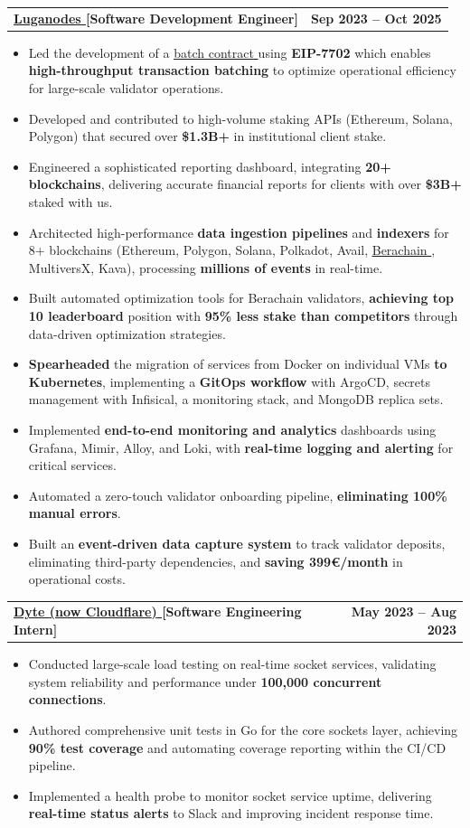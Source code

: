 \documentclass[a4paper,11pt]{article}
\makeatletter
\newcommand{\resumeItem}[1]{
  \item\small{
    {#1 \vspace{-2pt}}
  }
}
\newcommand{\resumeSubheadingg}[2]{
  \vspace{-2pt}\item
    \begin{tabular*}{1.0\textwidth}[t]{l@{\extracolsep{\fill}}r}
      \textbf{#1} & \textbf{\small #2} \\
    \end{tabular*}\vspace{-7pt}
}
\newcommand{\resumeItemListStart}{\begin{itemize}}
\newcommand{\resumeItemListEnd}{\end{itemize}\vspace{-5pt}}
\makeatother
\begin{document}
  \resumeSubheadingg
      {\href{https://www.luganodes.com/}{Luganodes \scriptsize\faExternalLink*} \hspace{0.5mm} [Software Development Engineer]}{Sep 2023 -- Oct 2025}
      \resumeItemListStart
      \resumeItem{Led the development of a {\href{https://github.com/luganodes/Pectra-Batch-Contract}{\underline{batch contract} \scriptsize\faExternalLink*}} using \textbf{EIP-7702} which enables \textbf{high-throughput transaction batching} to optimize operational efficiency for large-scale validator operations.}
      \resumeItem{Developed and contributed to high-volume staking APIs (Ethereum, Solana, Polygon) that secured over \textbf{\$1.3B+} in institutional client stake.}
      \resumeItem{Engineered a sophisticated reporting dashboard, integrating \textbf{20+ blockchains}, delivering accurate financial reports for clients with over \textbf{\$3B+} staked with us.}
      \resumeItem{Architected high-performance \textbf{data ingestion pipelines} and \textbf{indexers} for 8+ blockchains (Ethereum, Polygon, Solana, Polkadot, Avail, \href{https://github.com/luganodes/berachain-indexer}{\underline{Berachain} \scriptsize\faExternalLink*}, MultiversX, Kava), processing \textbf{millions of events} in real-time.}
      \resumeItem{Built automated optimization tools for Berachain validators, \textbf{achieving top 10 leaderboard} position with \textbf{95\% less stake than competitors} through data-driven optimization strategies.}
      \resumeItem{\textbf{Spearheaded} the migration of services from Docker on individual VMs \textbf{to Kubernetes}, implementing a \textbf{GitOps workflow} with ArgoCD, secrets management with Infisical, a monitoring stack, and MongoDB replica sets.}
      \resumeItem{Implemented \textbf{end-to-end monitoring and analytics} dashboards using Grafana, Mimir, Alloy, and Loki, with \textbf{real-time logging and alerting} for critical services.}
      \resumeItem{Automated a zero-touch validator onboarding pipeline, \textbf{eliminating 100\% manual errors}.}
      \resumeItem{Built an \textbf{event-driven data capture system} to track validator deposits, eliminating third-party dependencies, and \textbf{saving 399€/month} in operational costs.}
    \resumeItemListEnd
    \vspace{6pt}

\resumeSubheadingg
      {\href{https://dyte.io/}{Dyte \textnormal{(now \textbf{Cloudflare})} \scriptsize\faExternalLink*} \hspace{0.5mm} [Software Engineering Intern]}{May 2023 -- Aug 2023}
      \resumeItemListStart
        \resumeItem{Conducted large-scale load testing on real-time socket services, validating system reliability and performance under \textbf{100,000 concurrent connections}.}
        \resumeItem{Authored comprehensive unit tests in Go for the core sockets layer, achieving \textbf{90\% test coverage} and automating coverage reporting within the CI/CD pipeline.}
        \resumeItem{Implemented a health probe to monitor socket service uptime, delivering \textbf{real-time status alerts} to Slack and improving incident response time.}
    \resumeItemListEnd
    
\end{document}
